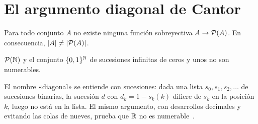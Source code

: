 \section{El argumento diagonal de Cantor}

\begin{teorema}[Cantor]\label{teo:t6-cantor}
Para todo conjunto $A$ no existe ninguna función sobreyectiva $A\to\mathcal{P}(A)$. En consecuencia, $\lvert A\rvert\neq\lvert\mathcal{P}(A)\rvert$.
\end{teorema}

\begin{corolario}\label{cor:t6-nonum}
$\mathcal{P}(\mathbb{N})$ y el conjunto $\{0,1\}^{\mathbb{N}}$ de sucesiones infinitas de ceros y unos no son numerables.
\end{corolario}

El nombre «diagonal» se entiende con sucesiones: dada una lista $s_0,s_1,s_2,\dots$ de sucesiones binarias, la sucesión $d$ con $d_k=1-s_k(k)$ difiere de $s_k$ en la posición $k$, luego no está en la lista. El mismo argumento, con desarrollos decimales y evitando las colas de nueves, prueba que $\mathbb{R}$ no es numerable~\cite[§14.2]{hammack}.

\addtocounter{definicion}{1}%

\addtocounter{definicion}{1}%

